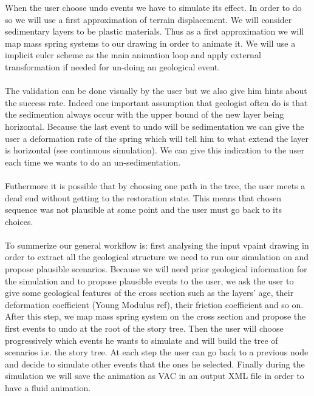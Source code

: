 \documentclass[12pt, a4paper]{memoir} %
\begin{document}
When the user choose undo events we have to simulate its effect. In order to do so we will use a first approximation of terrain displacement. We will consider sedimentary layers to be plastic materials. Thus as a first approximation we will map mass spring systems to our drawing in order to animate it. We will use a implicit euler scheme as the main animation loop and apply external transformation if needed for un-doing an geological event.\\\\

The validation can be done visually by the user but we also give him hints about the success rate. Indeed one important assumption that geologist often do is that the sedimention always occur with the upper bound of the new layer being horizontal. Because the last event to undo will be sedimentation we can give the user a deformation rate of the spring which will tell him to what extend the layer is horizontal (see continuous simulation). We can give this indication to the user each time we wants to do an un-sedimentation.\\\\

Futhermore it is possible that by choosing one path in the tree, the user meets a dead end without getting to the restoration state. This means that chosen sequence was not plausible at some point and the user must go back to its choices.\\\\

To summerize our general workflow is: first analysing the input vpaint drawing in order to extract all the geological structure we need to run our simulation on and propose plausible scenarios. Because we will need prior geological information for the simulation and to propose plausible events to the user, we ask the user to give some geological features of the cross section such as the layers' age, their deformation coefficient (Young Modulus ref), their friction coefficient and so on.\\ 
After this step, we map mass spring system on the cross section and propose the first events to undo at the root of the story tree. 
Then the user will choose progressively which events he wants to simulate and will build the tree of scenarios i.e. the story tree. At each step the user can go back to a previous node and decide to simulate other events that the ones he selected.
Finally during the simulation we will save the animation as VAC in an output XML file in order to have a fluid animation.\\\\
\end{document}

